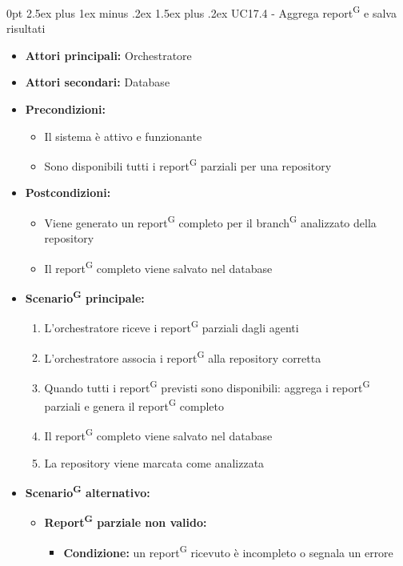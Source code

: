 \documentclass[a4paper, 11pt]{article}
\makeatletter
\renewcommand\paragraph{\@startsection{paragraph}{4}
  {0pt}
  {2.5ex plus 1ex minus .2ex}
  {1.5ex plus .2ex}
  {\normalfont\normalsize\bfseries\color{AccentDark}}}
\makeatother
\begin{document}
\paragraph{UC17.4 - Aggrega report\textsuperscript{G} e salva risultati} \label{UC17.4}
\begin{itemize}
	\item \textbf{Attori principali:} Orchestratore
	\item \textbf{Attori secondari:}  Database
	\item \textbf{Precondizioni:}
	\begin{itemize}
		\item Il sistema è attivo e funzionante
		\item Sono disponibili tutti i report\textsuperscript{G} parziali per una repository
	\end{itemize}
	\item \textbf{Postcondizioni:} 
	\begin{itemize}
		\item Viene generato un report\textsuperscript{G} completo per il branch\textsuperscript{G} analizzato della repository
		\item Il report\textsuperscript{G} completo viene salvato nel database
	\end{itemize}
	\item \textbf{Scenario\textsuperscript{G} principale:}
	\begin{enumerate}
		\item L'orchestratore riceve i report\textsuperscript{G} parziali dagli agenti
		\item L'orchestratore associa i report\textsuperscript{G} alla repository corretta
		\item Quando tutti i report\textsuperscript{G} previsti sono disponibili: aggrega i report\textsuperscript{G} parziali e genera il report\textsuperscript{G} completo
		\item Il report\textsuperscript{G} completo viene salvato nel database
		\item La repository viene marcata come analizzata
	\end{enumerate}
	\item \textbf{Scenario\textsuperscript{G} alternativo:}
	\begin{itemize}
		\item \textbf{Report\textsuperscript{G} parziale non valido:} 
			\begin{itemize}
				\item \textbf{Condizione:} un report\textsuperscript{G} ricevuto è incompleto o segnala un errore

\end{itemize}
\end{itemize}
\end{itemize}
\end{document}
